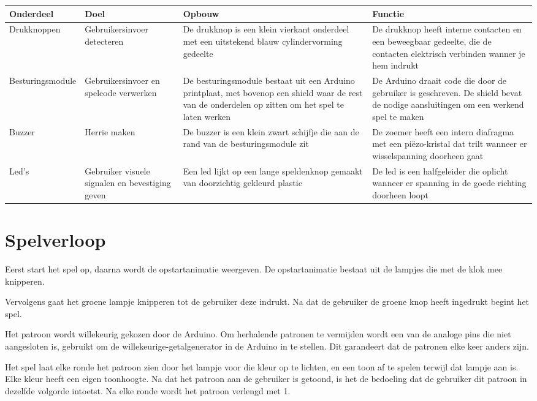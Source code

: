 \documentclass[12pt, a4paper, dutch]{article}
\begin{document}
\fontsize{9}{11.5}\selectfont
{\renewcommand{\arraystretch}{1.3}
\begin{tabularx}{\textwidth}{lp{}XX}
\toprule
Onderdeel & Doel & Opbouw & Functie\\
\midrule
Drukknoppen &
Gebruikersinvoer detecteren &
De drukknop is een klein vierkant onderdeel met een uitstekend blauw cylindervorming
gedeelte &
De drukknop heeft interne contacten en een beweegbaar gedeelte, die de contacten
elektrisch verbinden wanner je hem indrukt\\
\midrule
Besturingsmodule &
Gebruikersinvoer en spelcode verwerken &
De besturingsmodule bestaat uit een Arduino printplaat, met bovenop een shield waar
de rest van de onderdelen op zitten om het spel te laten werken &
De Arduino draait code die door de gebruiker is geschreven. De shield bevat de nodige
aansluitingen om een werkend spel te maken\\
\midrule
Buzzer &
Herrie maken &
De buzzer is een klein zwart schijfje die aan de rand van de besturingsmodule zit &
De zoemer heeft een intern diafragma met een pi\"ezo-kristal dat trilt wanneer er
wisselspanning doorheen gaat\\
\midrule
Led's &
Gebruiker visuele signalen en bevestiging geven &
Een led lijkt op een lange speldenknop gemaakt van doorzichtig gekleurd plastic &
De led is een halfgeleider die oplicht wanneer er spanning in de goede richting
doorheen loopt\\
\bottomrule
\end{tabularx}

\normalsize

\section{Spelverloop}

Eerst start het spel op, daarna wordt de opstartanimatie weergeven. De
opstartanimatie bestaat uit de lampjes die met de klok mee knipperen.

Vervolgens gaat het groene lampje knipperen tot de gebruiker deze indrukt. Na dat de
gebruiker de groene knop heeft ingedrukt begint het spel.

Het patroon wordt willekeurig gekozen door de Arduino. Om herhalende patronen te
vermijden wordt een van de analoge pins die niet aangesloten is, gebruikt om de
willekeurige-getalgenerator in de Arduino in te stellen. Dit garandeert dat de
patronen elke keer anders zijn.

Het spel laat elke ronde het patroon zien door het lampje voor die kleur op te
lichten, en een toon af te spelen terwijl dat lampje aan is. Elke kleur heeft een
eigen toonhoogte. Na dat het patroon aan de gebruiker is getoond, is het de bedoeling
dat de gebruiker dit patroon in dezelfde volgorde intoetst. Na elke ronde wordt het
patroon verlengd met 1.

}
\end{document}
